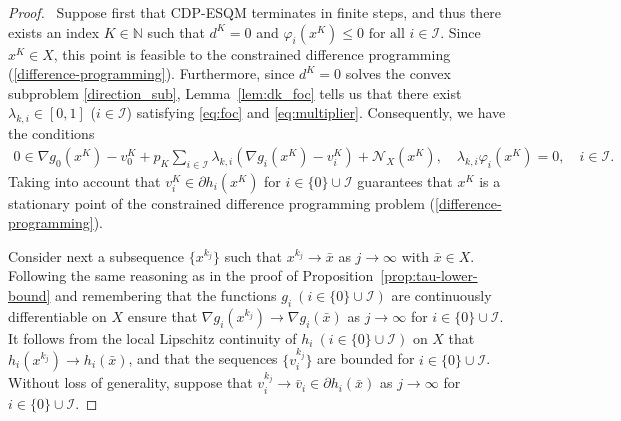 \documentclass[11pt,a4paper]{article}
\theoremstyle{plain}
\begin{document}
\begin{proof} \, Suppose first that CDP-ESQM terminates in finite steps, and thus there exists an index $K\in\mathbb N$ such that $d^K = 0$ and $\varphi_i(x^K) \le 0 \text{ for all } i\in\mathcal{I}$. Since $x^K \in X$, this point is feasible to the constrained difference programming (\ref{difference-programming}). Furthermore, since $d^K = 0$ solves the convex subproblem \eqref{direction_sub}, Lemma~\ref{lem:dk_foc} tells us that there exist $\lambda_{k,i} \in [0,1]$ ($i\in\mathcal I$) satisfying \eqref{eq:foc} and \eqref{eq:multiplier}. Consequently, we have the conditions
\begin{equation*}
\begin{aligned}
0 \in \nabla g_0(x^K)-v_0^K + p_K \sum_{i\in\mathcal I} \lambda_{k,i} \left(\nabla g_i(x^K)-v_i^K\right) + \mathcal N_X \left(x^K\right), \quad \lambda_{k,i} \varphi_i(x^K) = 0, \quad i\in\mathcal I.
\end{aligned}
\end{equation*}
Taking into account that $v_i^K \in \partial h_i(x^K)$ for $i \in \{0\} \cup \mathcal I$ guarantees that $x^K$ is a stationary point of the constrained difference programming problem (\ref{difference-programming}).

Consider next a subsequence $\{x^{k_j}\}$ such that $x^{k_j} \rightarrow \bar{x}$ as $j \rightarrow \infty$ with $\bar{x} \in X$. Following the same reasoning as in the proof of Proposition~\ref{prop:tau-lower-bound} and remembering that the functions $g_i \ (i\in\{0\}\cup \mathcal I)$ are continuously differentiable on $X$ ensure that $\nabla g_i(x^{k_j}) \to \nabla g_i(\bar{x})$ as $j\to\infty$ for $i \in \{0\} \cup \mathcal I$. It follows from the local Lipschitz continuity of $h_i \ (i\in\{0\}\cup\mathcal I)$ on $X$ that $h_i(x^{k_j}) \rightarrow h_i(\bar{x})$, and that the sequences $\{v_i^{k_j}\}$ are bounded for $i\in\{0\}\cup\mathcal I$. Without loss of generality, suppose that $v_i^{k_j} \rightarrow \bar{v}_i \in \partial h_i(\bar{x})$ as $j \to \infty$ for $i \in \{0\} \cup \mathcal I$. 


\end{proof}
\end{document}

